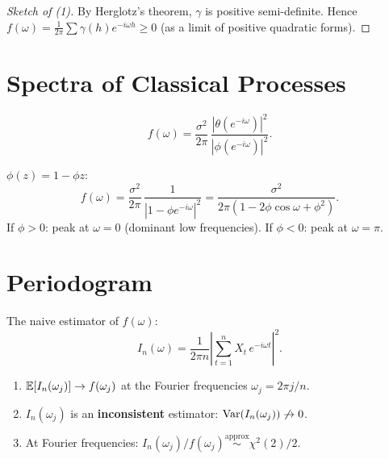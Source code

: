 \begin{proof}[Sketch of (1)]
By Herglotz's theorem, $\gamma$ is positive semi-definite. Hence $f(\omega)=\frac{1}{2\pi}\sum\gamma(h)e^{-i\omega h}\geq 0$ (as a limit of positive quadratic forms).
\end{proof}

\section{Spectra of Classical Processes}

\begin{theorem}
\[
f(\omega) = \frac{\sigma^2}{2\pi}\,\frac{|\theta(e^{-i\omega})|^2}{|\phi(e^{-i\omega})|^2}.
\]
\end{theorem}

\begin{example}[Spectrum of an AR(1)]
$\phi(z)=1-\phi z$:
\[
f(\omega) = \frac{\sigma^2}{2\pi}\,\frac{1}{|1-\phi e^{-i\omega}|^2} = \frac{\sigma^2}{2\pi(1-2\phi\cos\omega+\phi^2)}.
\]
If $\phi>0$: peak at $\omega=0$ (dominant low frequencies). If $\phi<0$: peak at $\omega=\pi$.
\end{example}

\begin{center}
\end{center}

\section{Periodogram}

\begin{definition}[Periodogram]
The naive estimator of $f(\omega)$:
\[
I_n(\omega) = \frac{1}{2\pi n}\left|\sum_{t=1}^n X_t\,e^{-i\omega t}\right|^2.
\]
\end{definition}

\begin{theorem}
\begin{enumerate}
\item $\mathbb{E}[I_n(\omega_j)]\to f(\omega_j)$ at the Fourier frequencies $\omega_j=2\pi j/n$.
\item $I_n(\omega_j)$ is an \textbf{inconsistent} estimator: $\operatorname{Var}(I_n(\omega_j))\not\to 0$.
\item At Fourier frequencies: $I_n(\omega_j)/f(\omega_j)\stackrel{\text{approx}}{\sim}\chi^2(2)/2$.
\end{enumerate}
\end{theorem}

